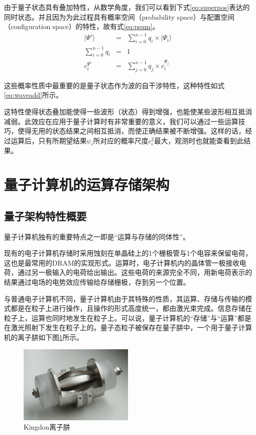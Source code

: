 \documentclass[UTF8, 11pt, a4paper]{ctexart}
\begin{document}
由于量子状态具有叠加特性，从数学角度，我们可以看到下式\ref{eq:superpos}表达的同时状态。并且因为为此过程具有概率空间（probability space）与配置空间（configuration space）的特性，故有式\ref{eq:psum}。
\begin{eqnarray}
\label{eq:superpos}
|\Psi ' \rangle &=& \sum_{i=0}^{n-1}{q_i \times |\Psi_{i}\rangle} \\
\label{eq:psum}
\sum_{i=0}^{n-1}{q_i} &=& 1 \\
\label{eq:waveadd}
c^{\Psi ' }_{i} &=& \sum_{j=0}^{n-1}{q_j \times c^{\Psi_{j}}_{i} }
\end{eqnarray}

这些概率性质中最重要的是量子状态作为波的自干涉特性，这种特性如式\ref{eq:waveadd}所示。

这特性使得状态叠加能使得一些波形（状态）得到增强，也能使某些波形相互抵消减弱。此效应在应用于量子计算时有非常重要的意义，我们可以通过一些运算技巧，使得无用的状态结果之间相互抵消，而使正确结果被不断增强。这样的话，经过运算后，只有所期望结果$\psi_i$所对应的概率尺度$c_{i}^{2}$最大，观测时也就能查看到此结果。

\newpage
\section{量子计算机的运算存储架构}
\subsection{量子架构特性概要}

量子计算机独有的重要特点之一即是“运算与存储的同体性”。

现有的电子计算机存储时采用蚀刻在单晶硅上的1个栅极管与1个电容来保留电荷，这也是最常用的DRAM的实现形式。运算时，电子计算机内的晶体管一极接收电荷，通过另一极输入的电荷给出输出。这些电荷的来源完全不同，用新电荷表示的结果通过电场的电势效应传输给存储栅极，存到另一个位置。

与普通电子计算机不同，量子计算机由于其特殊的性质，其运算、存储与传输的模式都是在粒子上进行操作，且操作的形式高度统一，都由激光束完成。信息存储在粒子上，运算也同时地发生在粒子上。可以说，量子计算机的“存储”与“运算”都是在激光照射下发生在粒子上的。量子态粒子被保存在量子肼中，一个用于量子计算机的离子肼如下图\ref{gf:iontrap}所示。

\begin{figure}[H]
	\centering
	\includegraphics[width=0.5\textwidth]{iontrap}
	\caption{Kingdon离子肼}
	\label{gf:iontrap}
\end{figure}
\end{document}
